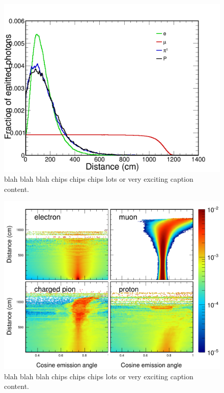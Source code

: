 \begin{figure}
    \includegraphics[width=\largefigwidth]{diagrams/cvn/emission_distance}
    \caption[emisson_distance]%
    {blah blah blah chips chips chips lots or very exciting caption content.}
    \label{fig:emisson_distance}
\end{figure}

\begin{figure}
    \includegraphics[width=\largefigwidth]{diagrams/cvn/emission_profile}
    \caption[emisson_profile]%
    {blah blah blah chips chips chips lots or very exciting caption content.}
    \label{fig:emisson_profile}
\end{figure}

